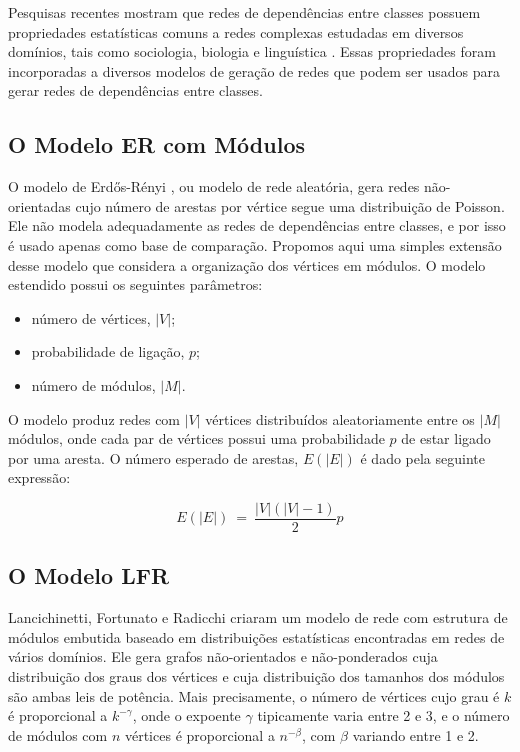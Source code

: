 \documentclass{acm_proc_article-sp}
\begin{document}
Pesquisas recentes mostram que redes de dependências entre classes possuem propriedades estatísticas comuns a redes complexas estudadas em diversos domínios, tais como sociologia, biologia e linguística \cite{Myers2003,Valverde2003}. Essas propriedades foram incorporadas a diversos modelos de geração de redes \cite{Bollobas2003,Lancichinetti2008} que podem ser usados para gerar redes de dependências entre classes. 

\subsection{O Modelo ER com Módulos}

O modelo de Erdős-Rényi \cite{Erdos1959}, ou modelo de rede aleatória, gera redes não-orientadas cujo número de arestas por vértice segue uma distribuição de Poisson. Ele não modela adequadamente as redes de dependências entre classes, e por isso é usado apenas como base de comparação. Propomos aqui uma simples extensão desse modelo que considera a organização dos vértices em módulos. O modelo estendido possui os seguintes parâmetros:

\begin{itemize}
  \item número de vértices, $|V|$;
  \item probabilidade de ligação, $p$;
  \item número de módulos, $|M|$.
\end{itemize} 

O modelo produz redes com $|V|$ vértices distribuídos aleatoriamente entre os $|M|$ módulos, onde cada par de vértices possui uma probabilidade $p$ de estar ligado por uma aresta. O número esperado de arestas, $E(|E|)$ é dado pela seguinte expressão:

\begin{equation}
E(|E|)~=~\frac{|V|(|V| - 1)}{2}p
\end{equation}


\subsection{O Modelo LFR}

Lancichinetti, Fortunato e Radicchi \cite{Lancichinetti2008} criaram um modelo de rede com estrutura de módulos embutida baseado em distribuições estatísticas encontradas em redes de vários domínios. Ele gera grafos não-orientados e não-ponderados cuja distribuição dos graus dos vértices e cuja distribuição dos tamanhos dos módulos são ambas leis de potência. Mais precisamente, o número de vértices cujo grau é $k$ é proporcional a $k^{-\gamma}$, onde o expoente $\gamma$ tipicamente varia entre 2 e 3, e o número de módulos com $n$ vértices é proporcional a $n^{-\beta}$, com $\beta$ variando entre 1 e 2.
\end{document}
